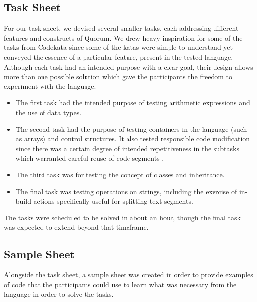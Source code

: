 \documentclass[preprint,10pt]{sigplanconf}
\begin{document}
\subsection{Task Sheet}
For our task sheet, we devised several smaller tasks, each addressing different features and constructs of Quorum. We drew heavy inspiration for some of the tasks from Codekata \cite{Codekata} since some of the katas were simple to understand yet conveyed the essence of a particular feature, present in the tested language.
Although each task had an intended purpose with a clear goal, their design allows more than one possible solution which gave the participants the freedom to experiment with the language.
\begin{itemize}
\item The first task had the intended purpose of testing arithmetic expressions and the use of data types.
\item The second task had the purpose of testing containers in the language (such as arrays) and control structures.
It also tested responsible code modification since there was a certain degree of intended repetitiveness in the subtasks which warranted careful reuse of code segments .%
\item The third task was for testing the concept of classes and inheritance.
\item The final task was testing operations on strings, including the exercise of in-build actions specifically useful for splitting text segments.
\end{itemize}
The tasks were scheduled to be solved in about an hour, though the final task was expected to extend beyond that timeframe.

\subsection{Sample Sheet}
Alongside the task sheet, a sample sheet was created in order to provide examples of code that the participants could use to learn what was necessary from the language in order to solve the tasks. 
\end{document}
